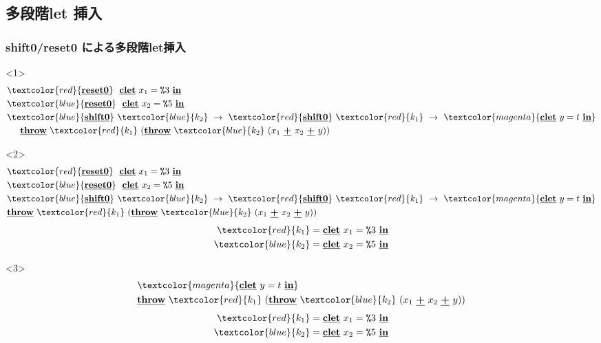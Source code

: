 \documentclass[dvipdfmx,cjk,xcolor=dvipsnames,envcountsect,notheorems,12pt]{beamer}
\newcommand\cResetz{\underline{\textbf{reset0}}}
\newcommand\cShiftz{\underline{\textbf{shift0}}}
\newcommand\cThrow{\underline{\textbf{throw}}}
\newcommand\cPlus{\underline{\textbf{+}}}
\newcommand\cLet{\underline{\textbf{clet}}}
\newcommand\cIn{\underline{\textbf{in}}}
\newcommand\csp[1]{\texttt{\%}{#1}}
\newcommand\red[1]{\textcolor{red}{#1}}
\newcommand\magenta[1]{\textcolor{magenta}{#1}}
\newcommand\blue[1]{\textcolor{blue}{#1}}
\theoremstyle{definition}
\begin{document}
\subsection{多段階let 挿入}
\begin{frame}
  \frametitle{shift0/reset0 による多段階let挿入}
    \begin{onlyenv}<1>
    \begin{align*}
      & \red{\cResetz} ~~\cLet~x_1=\csp{3}~\cIn \\
      & \blue{\cResetz} ~~\cLet~x_2=\csp{5}~\cIn \\
      & \blue{\cShiftz}~\blue{k_2}~\to~ \red{\cShiftz}~\red{k_1}~\to~ \magenta{\cLet~y=t~\cIn} \\
      & \phantom{=}~~ \cThrow~\red{k_1}~(\cThrow~\blue{k_2}~(x_1~\cPlus~x_2~\cPlus~y))
    \end{align*}
  \end{onlyenv}

  \begin{onlyenv}<2>
    \begin{align*}
      & \red{\cResetz} ~~\cLet~x_1=\csp{3}~\cIn \\
      & \blue{\cResetz} ~~\cLet~x_2=\csp{5}~\cIn \\
      & \blue{\cShiftz}~\blue{k_2}~\to~ \red{\cShiftz}~\red{k_1}~\to~ \magenta{\cLet~y=t~\cIn} \\
      & \cThrow~\red{k_1}~(\cThrow~\blue{k_2}~(x_1~\cPlus~x_2~\cPlus~y))
    \end{align*}
    \begin{align*}
      \red{k_1} &= \cLet~x_1=\csp{3}~\cIn  \\
      \blue{k_2} &= \cLet~x_2=\csp{5}~\cIn  \\
    \end{align*}
  \end{onlyenv}

  \begin{onlyenv}<3>
    \begin{align*}
      & \magenta{\cLet~y=t~\cIn} \\
      & \cThrow~\red{k_1}~(\cThrow~\blue{k_2}~(x_1~\cPlus~x_2~\cPlus~y))
    \end{align*}
    \begin{align*}
      \red{k_1} &= \cLet~x_1=\csp{3}~\cIn  \\
      \blue{k_2} &= \cLet~x_2=\csp{5}~\cIn  \\
    \end{align*}
  \end{onlyenv}


\end{frame}
\end{document}
